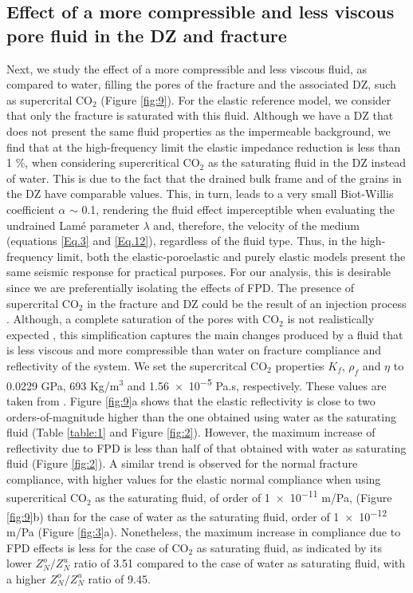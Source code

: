 \documentclass[draft]{agujournal2019}
\begin{document}
\subsection{Effect of a more compressible and less viscous pore fluid in the DZ and fracture}
Next, we study the effect of a more compressible and less viscous fluid, as compared to water, filling the pores of the fracture and the associated DZ, such as supercrital  CO$_2$ (Figure \ref{fig:9}). For the elastic reference model, we consider that only the fracture is saturated with this fluid. Although  we have a DZ that does not present the same fluid properties as the impermeable background, we find that at the high-frequency limit the elastic impedance reduction is less than 1 \%, when considering  supercritical CO$_2$ as the saturating fluid in the DZ instead of water. This is due to the fact that the drained bulk frame and of the grains in the DZ have
comparable values. This, in turn, leads to a very small Biot-Willis coefficient $\alpha$ $\sim$ 0.1, rendering the fluid effect imperceptible when evaluating the undrained Lamé parameter $\lambda$ and, therefore, the velocity of the medium (equations \ref{Eq.3} and \ref{Eq.12}), regardless of the fluid type.
Thus, in the high-frequency limit, both the elastic-poroelastic and purely elastic models present the same seismic response for practical purposes. For our analysis, this is desirable since we are preferentially isolating the effects of FPD.
The presence of supercrital CO$_2$ in the fracture and DZ could be the result of an injection process \cite{Lumley2010}. 
Although, a complete saturation of the pores with CO$_2$ is not realistically expected \cite{Chadwick2005,Chadwick2010}, this simplification captures the main changes produced by a fluid that is less viscous and more compressible than water on fracture compliance and reflectivity of the system. 
We set the supercritcal CO$_2$ properties $K_f$, $\rho_f$ and $\eta$ to 0.0229 GPa, 693 Kg/m$^3$ and \num{1.56e-5} Pa.s, respectively. These values are taken from . 
Figure \ref{fig:9}a shows that the elastic reflectivity  is close to two orders-of-magnitude higher than the one obtained using water as the saturating fluid (Table \ref{table:1} and Figure \ref{fig:2}). However, the maximum increase of reflectivity due to FPD  is less than half of that obtained with water as saturating fluid (Figure \ref{fig:2}).
A similar trend is observed for the normal fracture compliance, with  higher values for the elastic normal compliance when using supercritical CO$_2$ as the saturating fluid, of order of \num{1e-11} m/Pa, (Figure \ref{fig:9}b) than for the case of water as the saturating fluid,  order of \num{1e-12} m/Pa (Figure \ref{fig:3}a). Nonetheless, the maximum increase in compliance due to FPD effects is less for the case of CO$_2$ as saturating fluid, as indicated by its lower  $Z_N^o/Z_N^u$ ratio of 3.51 compared to the case of  water as  saturating fluid, with a higher $Z_N^o/Z_N^u$ ratio of 9.45.
\end{document}
